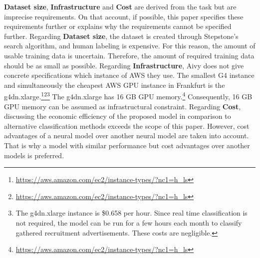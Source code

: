 \textbf{Dataset size}, \textbf{Infrastructure} and \textbf{Cost} are derived from the task but are imprecise requirements. On that account, if possible, this paper specifies these requirements further or explains why the requirements cannot be specified further. Regarding \textbf{Dataset size}, the dataset is created through Stepstone's search algorithm, and human labeling is expensive. For this reason, the amount of usable training data is uncertain. Therefore, the amount of required training data should be as small as possible. Regarding \textbf{Infrastructure}, Aivy does not give concrete specifications which instance of \ac{AWS} they use. The smallest G4 instance and simultaneously the cheapest AWS GPU instance in Frankfurt is the g4dn.xlarge.\footnote{\url{https://aws.amazon.com/ec2/instance-types/?nc1=h_ls}}\footnote{\url{https://aws.amazon.com/ec2/instance-types/?nc1=h_ls}}\footnote{The g4dn.xlarge instance is \$0.658 per hour. Since real time classification is not required, the model can be run for a few hours each month to classify gathered recruitment advertisements. These costs are negligible.} The g4dn.xlarge has 16 GB GPU memory.\footnote{\url{https://aws.amazon.com/ec2/instance-types/?nc1=h_ls}} Consequently, 16 GB GPU memory can be assumed as infrastructural constraint. Regarding \textbf{Cost}, discussing the economic efficiency of the proposed model in comparison to alternative classification methods exceeds the scope of this paper. However, cost advantages of a neural model over another neural model are taken into account. That is why a model with similar performance but cost advantages over another models is preferred.